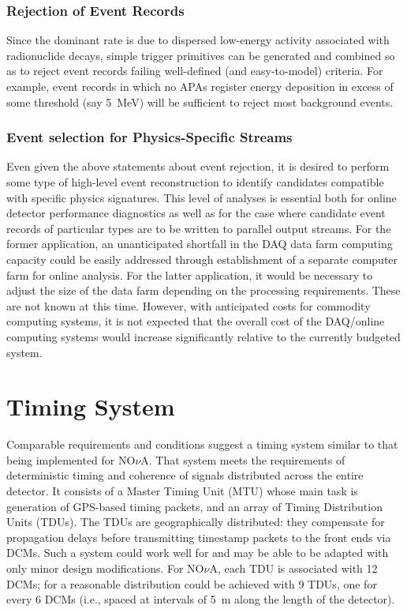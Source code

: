 \subsubsection{Rejection of Event Records}

Since the dominant rate is due to dispersed low-energy activity 
associated with radionuclide decays, simple trigger primitives can be 
generated and combined so as to reject event records failing well-defined 
(and easy-to-model) criteria.  
For example, event records in which no APAs 
register energy deposition in excess of some threshold (say 5~MeV) 
will be sufficient to reject most background events.

\subsubsection{Event selection for Physics-Specific Streams}

Even given the above statements about event rejection, it is desired to 
perform some type of high-level event reconstruction to identify candidates 
compatible with specific physics signatures.  This level of analyses is 
essential both for online detector performance diagnostics as well as 
for the case where candidate event records of particular types are to be 
written to parallel output streams.  For the former application, 
an unanticipated shortfall in the DAQ data farm computing capacity 
could be easily addressed through establishment of a separate computer farm 
for online analysis.
For the latter application, it would be necessary to adjust the size of 
the data farm depending on the processing requirements.  These are not 
known at this time.  However, with anticipated costs for commodity 
computing systems, it is not expected that the overall cost of the 
DAQ/online computing systems would increase significantly relative to 
the currently budgeted system.

\section{Timing System }
\label{sec:v5-trig-timing}

Comparable requirements and conditions suggest a timing system 
similar to that being implemented for NO$\nu$A.  That system meets the 
requirements of deterministic timing and coherence of signals distributed 
across the entire detector.   It consists of a Master Timing Unit (MTU)
whose main task is generation of GPS-based timing packets, and an 
array of Timing Distribution Units (TDUs).  The TDUs are geographically 
distributed: they compensate for propagation delays before transmitting 
timestamp packets to the front ends via DCMs.  Such a system could work 
well for \LBNE and may be able to be adapted with only minor 
design modifications.  For NO$\nu$A, each TDU is associated with 12 DCMs; 
for \LBNE a reasonable distribution could be achieved with 9 TDUs, 
one for every 6 DCMs (i.e., spaced at intervals of 5~m along the 
length of the detector).

